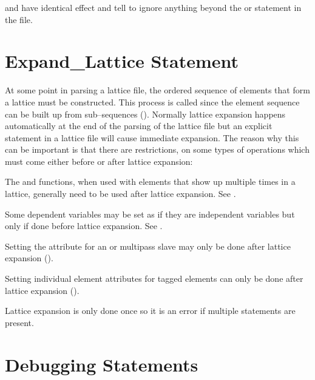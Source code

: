 {{ and  have identical effect and tell \bmad to
ignore anything beyond the  or  statement in
the file.

\section{Expand_Lattice Statement}
\label{s:expand}

At some point in parsing a lattice file, the ordered sequence of
elements that form a lattice must be constructed. This process is called
 since the element sequence can be built up from
sub--sequences (). Normally lattice expansion happens
automatically at the end of the parsing of the lattice file but an
explicit  statement in a lattice file will cause
immediate expansion. The reason why this can be important is that there
are restrictions, on some types of operations which must come either
before or after lattice expansion:
\begin{Itemize}
\item 
{}
The  and  functions, when used with elements
that show up multiple times in a lattice, generally need to be used
after lattice expansion. See .
\item 
Some dependent variables may be set as if they are independent
variables but only if done before lattice expansion. See .
\item 
Setting the  attribute for an 
 or  multipass
slave may only be done after lattice expansion ().
\item
{}
Setting individual element attributes for tagged elements can only be done
after lattice expansion ().
\end{Itemize}

Lattice expansion is only done once so it is an error if multiple
 statements are present.

\section{Debugging Statements}
\label{s:debug}

}}
